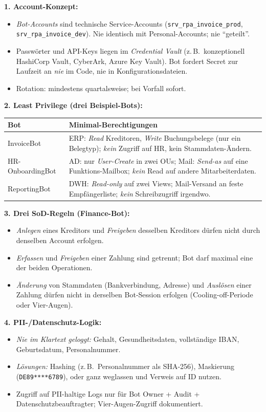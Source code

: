 \documentclass[11pt,a4paper,oneside]{article}
\begin{document}
\begin{loesungbox}
\textbf{1. Account-Konzept:}
\begin{itemize}
  \item \emph{Bot-Accounts} sind technische Service-Accounts (\texttt{srv\_rpa\_invoice\_prod}, \texttt{srv\_rpa\_invoice\_dev}). Nie identisch mit Personal-Accounts; nie ``geteilt''.
  \item Passw\"orter und API-Keys liegen im \emph{Credential Vault} (z.\,B.\ konzeptionell HashiCorp Vault, CyberArk, Azure Key Vault). Bot fordert Secret zur Laufzeit an \textendash{} \emph{nie} im Code, nie in Konfigurationsdateien.
  \item Rotation: mindestens quartalsweise; bei Vorfall sofort.
\end{itemize}

\smallskip
\textbf{2. Least Privilege (drei Beispiel-Bots):}

\smallskip
\begin{tabularx}{\linewidth}{@{}p{3.0cm}X@{}}
\toprule
\textbf{Bot} & \textbf{Minimal-Berechtigungen} \\
\midrule
InvoiceBot     & ERP: \emph{Read} Kreditoren, \emph{Write} Buchungsbelege (nur ein Belegtyp); \emph{kein} Zugriff auf HR, kein Stammdaten-\"Andern. \\
HR-OnboardingBot& AD: nur \emph{User-Create} in zwei OUs; Mail: \emph{Send-as} auf eine Funktions-Mailbox; \emph{kein} Read auf andere Mitarbeiterdaten. \\
ReportingBot   & DWH: \emph{Read-only} auf zwei Views; Mail-Versand an feste Empf\"angerliste; \emph{kein} Schreibzugriff irgendwo. \\
\bottomrule
\end{tabularx}

\smallskip
\textbf{3. Drei SoD-Regeln (Finance-Bot):}
\begin{itemize}
  \item \emph{Anlegen} eines Kreditors und \emph{Freigeben} desselben Kreditors d\"urfen nicht durch denselben Account erfolgen.
  \item \emph{Erfassen} und \emph{Freigeben} einer Zahlung sind getrennt; Bot darf maximal eine der beiden Operationen.
  \item \emph{\"Anderung} von Stammdaten (Bankverbindung, Adresse) und \emph{Ausl\"osen} einer Zahlung d\"urfen nicht in derselben Bot-Session erfolgen (Cooling-off-Periode oder Vier-Augen).
\end{itemize}

\smallskip
\textbf{4. PII-/Datenschutz-Logik:}
\begin{itemize}
  \item \emph{Nie im Klartext geloggt:} Gehalt, Gesundheitsdaten, vollst\"andige IBAN, Geburtsdatum, Personalnummer.
  \item \emph{L\"osungen:} Hashing (z.\,B.\ Personalnummer als SHA-256), Maskierung (\texttt{DE89****6789}), oder ganz weglassen und Verweis auf ID nutzen.
  \item Zugriff auf PII-haltige Logs nur f\"ur Bot Owner + Audit + Datenschutzbeauftragter; Vier-Augen-Zugriff dokumentiert.
\end{itemize}


\end{loesungbox}
\end{document}
